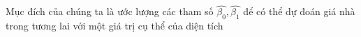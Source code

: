\documentclass[preview]{standalone}
\begin{document}
\begin{center}
Mục đích của chúng ta là ước lượng các tham số $\hat{\beta_0}, \hat{\beta_1}$ để có thể dự đoán giá nhà trong
                    tương lai với một giá trị cụ thể của diện tích
\end{center}
\end{document}
